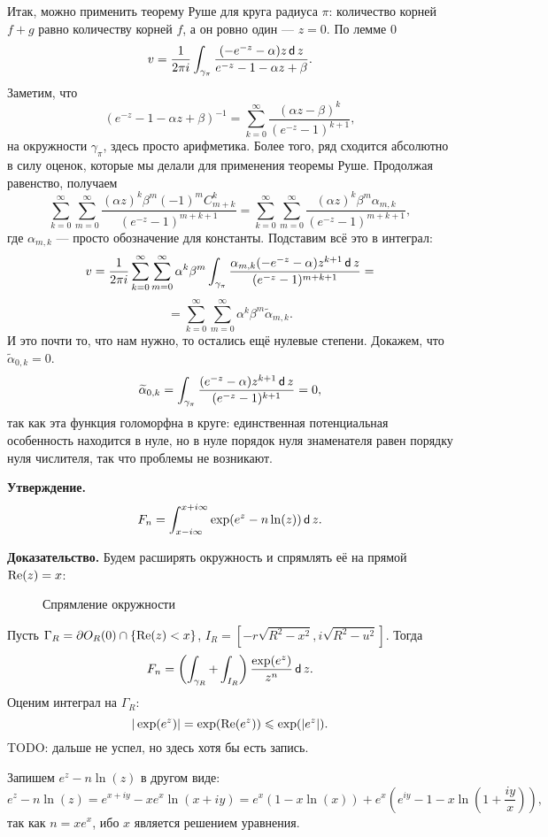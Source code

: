 Итак, можно применить теорему Руше для круга радиуса $\pi$: количество корней $f + g$ равно количеству корней $f$, а он ровно один --- $z = 0$.
По лемме 0
\[
    v = \frac{1}{2\pi i} \int_{\gamma_\pi} \frac{(-e^{-z} - \alpha) z \operatorname{\mathsf d} z}{e^{-z} - 1 - \alpha z + \beta}.
\]
Заметим, что
\[
    (e^{-z} - 1 - \alpha z + \beta)^{-1} = \sum_{k=0}^{\infty} \frac{(\alpha z - \beta)^k}{(e^{-z} - 1)^{k+1}},
\]
на окружности $\gamma_\pi$, здесь просто арифметика.
Более того, ряд сходится абсолютно в силу оценок, которые мы делали для применения теоремы Руше.
Продолжая равенство, получаем
\[
    \sum_{k=0}^{\infty} \sum_{m=0}^{\infty} \frac{(\alpha z)^k \beta^m (-1)^m C_{m+k}^k}{(e^{-z} - 1)^{m+k+1}} =
    \sum_{k=0}^{\infty} \sum_{m=0}^{\infty} \frac{(\alpha z)^k \beta^m \alpha_{m,k}}{(e^{-z} - 1)^{m+k+1}},
\]
где $\alpha_{m,k}$ --- просто обозначение для константы.
Подставим всё это в интеграл:
\[
    v = \frac{1}{2\pi i} \sum_{k=0}^{\infty} \sum_{m=0}^{\infty} \alpha^k \beta^m \int_{\gamma_\pi} \frac{\alpha_{m,k} (-e^{-z} - \alpha) z^{k+1} \operatorname{\mathsf d} z}{(e^{-z} - 1)^{m+k+1}} =
\]
\[
    = \sum_{k=0}^{\infty} \sum_{m=0}^{\infty} \alpha^k \beta^m \widetilde\alpha_{m,k}.
\]
И это почти то, что нам нужно, то остались ещё нулевые степени.
Докажем, что $\widetilde \alpha_{0,k} = 0$.
\[
    \widetilde \alpha_{0,k} = \int_{\gamma_\pi} \frac{(e^{-z} - \alpha) z^{k+1} \operatorname{\mathsf d} z}{(e^{-z} - 1)^{k+1}} = 0,
\]
так как эта функция голоморфна в круге: единственная потенциальная особенность находится в нуле, но в нуле порядок нуля знаменателя равен порядку нуля числителя, так что проблемы не возникают.

\QED

\textbf{Утверждение.}
\[
    F_n = \int_{x - i\infty}^{x + i\infty} \exp(e^z - n \ln(z)) \operatorname{\mathsf d} z.
\]

\textbf{Доказательство.} Будем расширять окружность и спрямлять её на прямой $\operatorname{Re}(z) = x$:
\begin{figure}[ht]
    \centering
    \caption{Спрямление окружности}
\end{figure}
Пусть $\Gamma_R = \partial O_R(0) \cap \{\operatorname{Re}(z) < x\}$, $I_R = [-r \sqrt{R^2 - x^2}, i\sqrt{R^2 - u^2}]$.
Тогда
\[
    F_n = \left( \int_{\gamma_R} + \int_{I_R} \right) \frac{\exp(e^z)}{z^n} \operatorname{\mathsf d} z.
\]
Оценим интеграл на $\Gamma_R$:
\[
    |\exp(e^z)| = \exp(\operatorname{Re}(e^z)) \leqslant \exp(|e^z|).
\]
TODO: дальше не успел, но здесь хотя бы есть запись.

\QED

Запишем $e^z - n \ln(z)$ в другом виде:
\[
    e^z - n \ln(z) = e^{x + iy} - xe^x \ln(x + iy) = e^x (1 - x \ln(x)) + e^x \left(e^{iy} - 1 - x \ln \left(1 + \frac{iy}{x} \right) \right),
\]
так как $n = xe^x$, ибо $x$ является решением уравнения.

